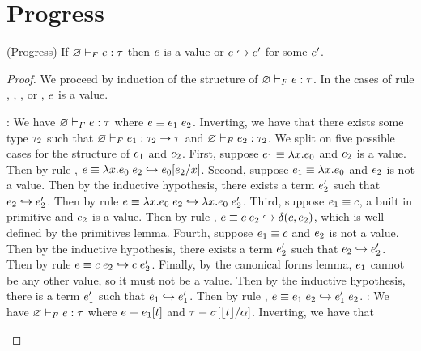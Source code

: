 \section{Progress}
\begin{lemma} (Progress) \label{lem:progressF-a} 
    If ${\varnothing} \vdash_F {e} : {\tau}$ 
    then $e$ is a value or $e \hookrightarrow e'$ for some $e'$.
\end{lemma}
\begin{proof} 
We proceed by induction of the structure of 
${\varnothing} \vdash_F {e} : {\tau}$. In the cases of rule
\fPrim, \fVar, \fAbs, or \fTAbs, $e$ is a value.
\begin{itemize}
\pfcase{\fApp}: We have 
${\varnothing} \vdash_F {e} : {\tau}$ where
$\sexpr \equiv \app{\sexpr_1}{\sexpr_2}$. 
Inverting, we have that there exists some type $\tau_2$
such that ${\varnothing} \vdash_F {e_1} : {\tau_2 \rightarrow \tau}$
and ${\varnothing} \vdash_F {e_2} : {\tau_2}$.
We split on five possible cases for 
the structure of $e_1$ and $e_2$. 
%
First, suppose $e_1 \equiv \lambda x. {e_0}$ and $e_2$ is 
a value. Then by rule \eAppAbs, 
$e \equiv \app{\vabs{x}{\sexpr_0}}{\sexpr_2} \step \subst{\sexpr_0}{x}{\sexpr_2}$.
%
Second, suppose $e_1 \equiv \lambda x. {e_0}$ and $e_2$
is not a value. Then by the inductive hypothesis, there exists a term
$e'_2$ such that $e_2 \hookrightarrow e'_2$. Then by rule \eAppV
$e \equiv {\ensuremath{\lambda x. {e_0}}}\;{e_2} \hookrightarrow {\ensuremath{\lambda x. {e_0}}}\;{e'_2}$.
%
Third, suppose $e_1 \equiv c$, a built in primitive 
and $e_2$ is a value. Then by rule \ePrim, 
$e \equiv {\ensuremath{c}}\;{e_2} \hookrightarrow \delta(c,e_2)$,
which is well-defined by the primitives lemma.
%
Fourth, suppose $e_1 \equiv c$ and $e_2$
is not a value. Then by the inductive hypothesis, there exists a term
$e'_2$ such that $e_2 \hookrightarrow e'_2$. Then by rule \eAppV
$e \equiv {\ensuremath{c}}\;{e_2} \hookrightarrow {\ensuremath{c}}\;{e'_2}$.
%
Finally, by the canonical forms lemma, $e_1$ cannot be any other
value, so it must not be a value. Then by the inductive hypothesis,
there is a term $e'_1$ such that $e_1 \hookrightarrow e'_1$. 
Then by rule \eApp,
$e \equiv \app{\sexpr_1}{\sexpr_2} \step \app{\sexpr'_1}{\sexpr_2}$.
\pfcase{\fTApp}: We have 
${\varnothing} \vdash_F {e} : {\tau}$ where
$e \equiv e_1[t]$ and
$\tau \equiv {\sigma}[\lfloor{\ensuremath{t}}\rfloor/\alpha]$. 
Inverting, we have that 

\end{itemize}
\end{proof}
